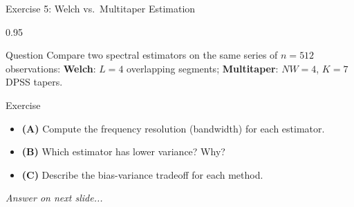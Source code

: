 \documentclass[9pt, aspectratio=169, t]{beamer}
\begin{document}
\begin{frame}{Exercise 5: Welch vs.\ Multitaper Estimation}
    \begin{cminipage}{0.95\textwidth}
    \begin{alertblock}{Question}
        Compare two spectral estimators on the same series of $n = 512$ observations:
        \textbf{Welch}: $L = 4$ overlapping segments; \quad \textbf{Multitaper}: $NW = 4$, $K = 7$ DPSS tapers.
    \end{alertblock}

    \vspace{0.2cm}

    \begin{block}{Exercise}
        \begin{itemize}\setlength{\itemsep}{3pt}
            \item \textcolor{MainBlue}{\textbf{(A)}} Compute the frequency resolution (bandwidth) for each estimator.
            \item \textcolor{MainBlue}{\textbf{(B)}} Which estimator has lower variance? Why?
            \item \textcolor{MainBlue}{\textbf{(C)}} Describe the bias-variance tradeoff for each method.
        \end{itemize}
    \end{block}

    \vspace{0.3cm}

    \begin{center}
        \textit{Answer on next slide...}
    \end{center}
    \end{cminipage}
\end{frame}
\end{document}
